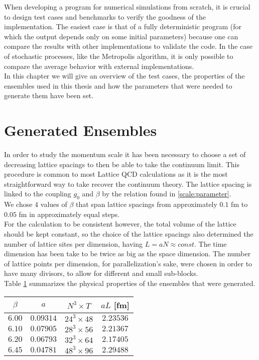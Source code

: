 When developing a program for numerical simulations from scratch, it is crucial to design test cases and benchmarks to verify the goodness of the implementation. The easiest case is that of a fully deterministic program (for which the output depends only on some initial parameters) because one can compare the results with other implementations to validate the code. In the case of stochastic processes, like the Metropolis algorithm, it is only possible to compare the average behavior with external implementations. \\
In this chapter we will give an overview of the test cases, the properties of the ensembles used in this thesis and how the parameters that were needed to generate them have been set.

\section{Generated Ensembles}
In order to study the momentum scale it has been necessary to choose a set of decreasing lattice spacings to then be able to take the continuum limit. This procedure is common to most Lattice QCD calculations as it is the most straightforward way to take recover the continuum theory. The lattice spacing is linked to the coupling $g_0$ and $\beta$ by the relation found in \cref{scale:parameter}.\\ 
We chose 4 values of $\beta$ that span lattice spacings from approximately $0.1$ fm to $0.05$ fm in approximately equal steps. \\
For the calculation to be consistent however, the total volume of the lattice should be kept constant, so the choice of the lattice spacings also determined the number of lattice sites per dimension, having $L = aN\approx const$. The time dimension has been take to be twice as big as the space dimension. The number of lattice points per dimension, for parallelization's sake, were chosen in order to have many divisors, to allow for different and small sub-blocks. \\
Table \cref{runs:ensembles} summarizes the physical properties of the ensembles that were generated.
\begin{table}[!htb]
    \begin{center}
    \begin{tabular}{cccc}
        $\beta$ & $a$ & $N^3\times T$ & $aL$ [fm]\\\hline
        $6.00$ & $0.09314$ & $24^3 \times 48$ & $2.23536$\\
        $6.10$ & $0.07905$ & $28^3 \times 56$ & $2.21367$\\
        $6.20$ & $0.06793$ & $32^3 \times 64$ & $2.17405$\\
        $6.45$ & $0.04781$ & $48^3 \times 96$ & $2.29488$\\
    \end{tabular}
    \label{runs:ensembles}
    \end{center}
\end{table}
